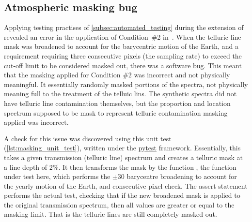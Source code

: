 \subsection{Atmospheric masking bug}
\label{subsec:condition_two_bug}
Applying testing practises of \cref{subsec:automated_testing} during the extension of \eniric{} revealed an error in the application of Condition~\#2 in~\citep{figueira_radial_2016}.
When the telluric line mask was broadened to account for the barycentric motion of the Earth, and a requirement requiring three consecutive pixels (the sampling rate) to exceed the cut-off limit to be considered masked out, there was a software bug.
This meant that the masking applied for Condition \#2 was incorrect and not physically meaningful.
It essentially randomly masked portions of the spectra, not physically meaning full to the treatment of the telluic lins.
The synthetic spectra did not have telluric line contamination themselves, but the proportion and location spectrum supposed to be mask to represent telluric contamination masking applied was incorrect.

A check for this issue was discovered using this unit test (\cref{lst:masking_unit_test}), written under the \href{https://docs.pytest.org}{pytest} framework.
Essentially, this takes a given transmission (telluric line) spectrum and creates a telluric mask at a line depth of 2\%.
It then transforms the mask by the function , the function under test here, which performs the \(\pm30\)\kmps{} barycentre broadening to account for the yearly motion of the Earth, and consecutive pixel check.
The assert statement performs the actual test, checking that if the new broadened mask is applied to the original transmission spectrum, then all values are greater or equal to the masking limit.
That is the telluric lines are still completely masked out.

